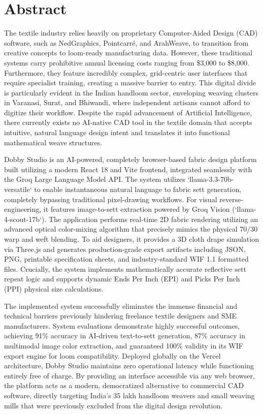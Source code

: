 \chapter*{Abstract}

The textile industry relies heavily on proprietary Computer-Aided Design (CAD) software, such as NedGraphics, Pointcarré, and ArahWeave, to transition from creative concepts to loom-ready manufacturing data. However, these traditional systems carry prohibitive annual licensing costs ranging from \$3,000 to \$8,000. Furthermore, they feature incredibly complex, grid-centric user interfaces that require specialist training, creating a massive barrier to entry. This digital divide is particularly evident in the Indian handloom sector, enveloping weaving clusters in Varanasi, Surat, and Bhiwandi, where independent artisans cannot afford to digitize their workflow. Despite the rapid advancement of Artificial Intelligence, there currently exists no AI-native CAD tool in the textile domain that accepts intuitive, natural language design intent and translates it into functional mathematical weave structures.

Dobby Studio is an AI-powered, completely browser-based fabric design platform built utilizing a modern React 18 and Vite frontend, integrated seamlessly with the Groq Large Language Model API. The system utilizes `llama-3.3-70b-versatile` to enable instantaneous natural language to fabric sett generation, completely bypassing traditional pixel-drawing workflows. For visual reverse-engineering, it features image-to-sett extraction powered by Groq Vision (`llama-4-scout-17b`). The application performs real-time 2D fabric rendering utilizing an advanced optical color-mixing algorithm that precisely mimics the physical 70/30 warp and weft blending. To aid designers, it provides a 3D cloth drape simulation via Three.js and generates production-grade export artifacts including JSON, PNG, printable specification sheets, and industry-standard WIF 1.1 formatted files. Crucially, the system implements mathematically accurate reflective sett repeat logic and supports dynamic Ends Per Inch (EPI) and Picks Per Inch (PPI) physical size calculations.

The implemented system successfully eliminates the immense financial and technical barriers previously hindering freelance textile designers and SME manufacturers. System evaluations demonstrate highly successful outcomes, achieving 91\% accuracy in AI-driven text-to-sett generation, 87\% accuracy in multimodal image color extraction, and guaranteed 100\% validity in its WIF export engine for loom compatibility. Deployed globally on the Vercel architecture, Dobby Studio maintains zero operational latency while functioning entirely free of charge. By providing an interface accessible via any web browser, the platform acts as a modern, democratized alternative to commercial CAD software, directly targeting India's 35 lakh handloom weavers and small weaving mills that were previously excluded from the digital design revolution.
